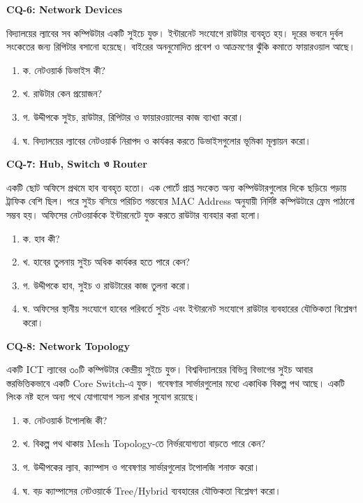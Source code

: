 \textbf{CQ-6: Network Devices}

বিদ্যালয়ের ল্যাবের সব কম্পিউটার একটি সুইচে যুক্ত। ইন্টারনেট সংযোগে রাউটার ব্যবহৃত হয়। দূরের ভবনে দুর্বল সংকেতের জন্য রিপিটার বসানো হয়েছে। বাইরের অননুমোদিত প্রবেশ ও আক্রমণের ঝুঁকি কমাতে ফায়ারওয়াল আছে।

\begin{enumerate}
\item ক. নেটওয়ার্ক ডিভাইস কী?
\item খ. রাউটার কেন প্রয়োজন?
\item গ. উদ্দীপকে সুইচ, রাউটার, রিপিটার ও ফায়ারওয়ালের কাজ ব্যাখ্যা করো।
\item ঘ. বিদ্যালয়ের ল্যাবের নেটওয়ার্ক নিরাপদ ও কার্যকর করতে ডিভাইসগুলোর ভূমিকা মূল্যায়ন করো।
\end{enumerate}

\textbf{CQ-7: Hub, Switch ও Router}

একটি ছোট অফিসে প্রথমে হাব ব্যবহৃত হতো। এক পোর্টে প্রাপ্ত সংকেত অন্য কম্পিউটারগুলোর দিকে ছড়িয়ে পড়ায় ট্রাফিক বেশি ছিল। পরে সুইচ বসিয়ে পরিচিত গন্তব্যের MAC Address অনুযায়ী নির্দিষ্ট কম্পিউটারে ফ্রেম পাঠানো সম্ভব হয়। অফিসের নেটওয়ার্ককে ইন্টারনেটে যুক্ত করতে রাউটার ব্যবহার করা হলো।

\begin{enumerate}
\item ক. হাব কী?
\item খ. হাবের তুলনায় সুইচ অধিক কার্যকর হতে পারে কেন?
\item গ. উদ্দীপকে হাব, সুইচ ও রাউটারের কাজ তুলনা করো।
\item ঘ. অফিসের স্থানীয় সংযোগে হাবের পরিবর্তে সুইচ এবং ইন্টারনেট সংযোগে রাউটার ব্যবহারের যৌক্তিকতা বিশ্লেষণ করো।
\end{enumerate}

\textbf{CQ-8: Network Topology}

একটি ICT ল্যাবের ৩০টি কম্পিউটার কেন্দ্রীয় সুইচে যুক্ত। বিশ্ববিদ্যালয়ের বিভিন্ন বিভাগের সুইচ আবার স্তরভিত্তিকভাবে একটি Core Switch-এ যুক্ত। গবেষণার সার্ভারগুলোর মধ্যে একাধিক বিকল্প পথ আছে। একটি লিংক নষ্ট হলে অন্য পথে যোগাযোগ সচল রাখার সুযোগ রয়েছে।

\begin{enumerate}
\item ক. নেটওয়ার্ক টপোলজি কী?
\item খ. বিকল্প পথ থাকায় Mesh Topology-তে নির্ভরযোগ্যতা বাড়তে পারে কেন?
\item গ. উদ্দীপকের ল্যাব, ক্যাম্পাস ও গবেষণার সার্ভারগুলোর টপোলজি শনাক্ত করো।
\item ঘ. বড় ক্যাম্পাসের নেটওয়ার্কে Tree/Hybrid ব্যবহারের যৌক্তিকতা বিশ্লেষণ করো।
\end{enumerate}


